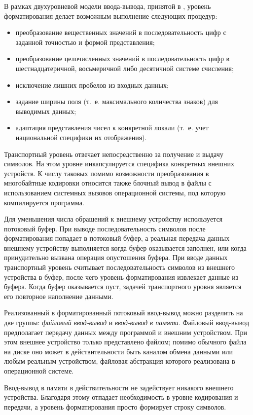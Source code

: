 В рамках двухуровневой модели ввода-вывода, принятой в , 
уровень форматирования делает возможным выполнение следующих
процедур:

\begin{itemize}
\item преобразование вещественных значений в последовательность цифр с заданной точностью и формой представления;
\item преобразование целочисленных значений в последовательность цифр в шестнадцатеричной, восьмеричной либо десятичной
системе счисления;
\item исключение лишних пробелов из входных данных;
\item задание ширины поля (т.~е. максимального количества знаков) для выводимых данных;
\item адаптация представления чисел к конкретной локали (т.~е. учет национальной специфики их отображения).
\end{itemize}
Транспортный уровень отвечает непосредственно за получение и выдачу символов. На этом уровне инкапсулируется специфика
конкретных внешних устройств. К числу таковых помимо возможности преобразования в многобайтные кодировки относится
также блочный вывод в файлы с использованием системных вызовов операционной системы, под которую компилируется
программа.

 Для уменьшения числа обращений к внешнему устройству используется потоковый буфер. При выводе последовательность
символов после форматирования попадает в потоковый буфер, а реальная передача данных внешнему устройству выполняется
когда буфер оказывается заполнен, или когда принудительно вызвана операция опустошения буфера. При вводе данных
транспортный уровень считывает последовательность символов из внешнего устройства в буфер, после чего уровень
форматирования извлекает данные из буфера. Когда буфер оказывается пуст, задачей транспортного уровня является его
повторное наполнение данными.

Реализованный в  форматированный потоковый ввод-вывод можно разделить на две группы: \emph{файловый 
ввод-вывод} и \emph{ввод-вывод в памяти}. Файловый ввод-вывод предполагает передачу данных между
программой и внешним устройством. При этом внешнее устройство только представлено файлом; помимо обычного файла на
диске оно может в действительности быть каналом обмена данными или любым реальным устройством, файловая абстракция
которого реализована в операционной системе. 

Ввод-вывод в памяти в действительности не задействует никакого внешнего устройства. Благодаря этому отпадает
необходимость в уровне кодирования и передачи, а уровень форматирования просто формирует строку символов. 

